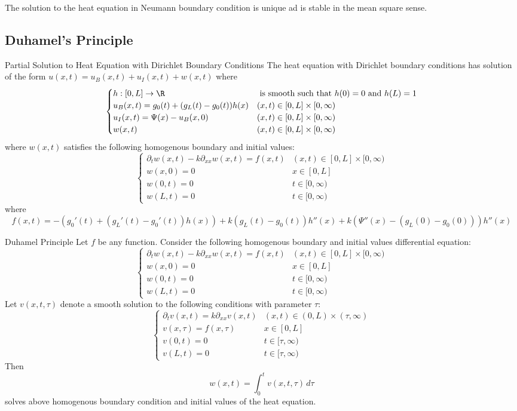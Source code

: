 \documentclass[a4paper]{article}
\begin{document}
\begin{prp}{}{} The solution to the heat equation in Neumann boundary condition is unique ad is stable in the mean square sense. 
\end{prp}

\subsection{Duhamel's Principle}
\begin{thm}{Partial Solution to Heat Equation with Dirichlet Boundary Conditions}{} The heat equation with Dirichlet boundary conditions has solution of the form $u(x,t)=u_B(x,t)+u_I(x,t)+w(x,t)$ where $$\begin{cases}
h:[0,L]\to\R & \text{ is smooth such that }h(0)=0\text{ and }h(L)=1\\
u_B(x,t)=g_0(t)+(g_L(t)-g_0(t))h(x) & (x,t)\in[0,L]\times[0,\infty)\\
u_I(x,t)=\Psi(x)-u_B(x,0) & (x,t)\in[0,L]\times[0,\infty)\\
w(x,t) & (x,t)\in[0,L]\times[0,\infty)
\end{cases}$$ where $w(x,t)$ satisfies the following homogenous boundary and initial values: $$\begin{cases}
\partial_{t}w(x,t)-k\partial_{xx}w(x,t)=f(x,t) & (x,t)\in[0,L]\times[0,\infty)\\
w(x,0)=0 & x\in[0,L]\\
w(0,t)=0 & t\in[0,\infty)\\
w(L,t)=0 & t\in[0,\infty)
\end{cases}$$ where $$f(x,t)=-(g_0'(t)+(g_L'(t)-g_0'(t))h(x))+k(g_L(t)-g_0(t))h''(x)+k(\Psi''(x)-(g_L(0)-g_0(0)))h''(x)$$
\end{thm}

\begin{thm}{Duhamel Principle}{} Let $f$ be any function. Consider the following homogenous boundary and initial values differential equation: $$\begin{cases}
\partial_{t}w(x,t)-k\partial_{xx}w(x,t)=f(x,t) & (x,t)\in[0,L]\times[0,\infty)\\
w(x,0)=0 & x\in[0,L]\\
w(0,t)=0 & t\in[0,\infty)\\
w(L,t)=0 & t\in[0,\infty)
\end{cases}$$
Let $v(x,t,\tau)$ denote a smooth solution to the following conditions with parameter $\tau$: $$\begin{cases}
\partial_tv(x,t)=k\partial_{xx}v(x,t) & (x,t)\in(0,L)\times(\tau,\infty)\\
v(x,\tau)=f(x,\tau) & x\in[0,L]\\
v(0,t)=0 & t\in[\tau,\infty)\\
v(L,t)=0 & t\in[\tau,\infty)
\end{cases}$$
Then $$w(x,t)=\int_0^t v(x,t,\tau)\,d\tau$$ solves above homogenous boundary condition and initial values of the heat equation. 
\end{thm}
\end{document}
